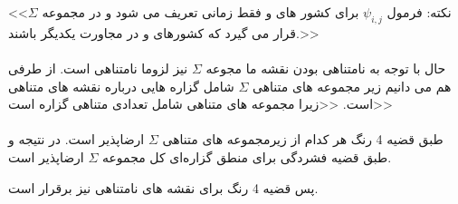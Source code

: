 \begin{ans}
    <<نکته: فرمول 
    $\psi_{i,j}$
    برای کشور های 
    و
    فقط زمانی تعریف می شود و در مجموعه 
    $\Sigma$
    قرار می گیرد که کشورهای 
    و
    در مجاورت یکدیگر باشند.>>
    \\
    \\
    حال با توجه به نامتناهی بودن نقشه ما مجوعه 
    $\Sigma$
    نیز لزوما نامتناهی است. از طرفی هم می دانیم زیر مجموعه های متناهی 
    $\Sigma$
    شامل گزاره هایی درباره نقشه های متناهی است.
    <<زیرا مجموعه های متناهی شامل تعدادی متناهی گزاره است>>
    \\
    \\
    طبق قضیه 4 رنگ هر کدام از زیرمجموعه های متناهی 
    $\Sigma$
    ارضاپذیر است. در نتیجه و طبق قضیه فشردگی برای منطق گزاره‌ای کل مجموعه
    $\Sigma$
    ارضاپذیر است. 

    پس قضیه 4 رنگ برای نقشه های نامتناهی نیز برقرار است.
\end{ans}
